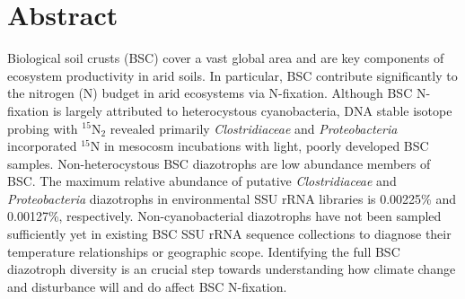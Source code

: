\section{Abstract}
Biological soil crusts (BSC) cover a vast global area and are key components of
ecosystem productivity in arid soils. In particular, BSC contribute
significantly to the nitrogen (N) budget in arid ecosystems via N-fixation.
Although BSC N-fixation is largely attributed to heterocystous cyanobacteria,
DNA stable isotope probing with $^{15}$N$_{2}$ revealed primarily
\textit{Clostridiaceae} and \textit{Proteobacteria} incorporated $^{15}$N in
mesocosm incubations with light, poorly developed BSC samples.
Non-heterocystous BSC diazotrophs are low abundance members of BSC. The maximum
relative abundance of putative \textit{Clostridiaceae} and
\textit{Proteobacteria} diazotrophs in environmental SSU rRNA libraries  is
0.00225\% and 0.00127\%, respectively.  
Non-cyanobacterial diazotrophs have not been sampled sufficiently yet in
existing BSC SSU rRNA sequence collections to diagnose their temperature
relationships or geographic scope. Identifying the full BSC diazotroph
diversity is an crucial step towards understanding how climate change and
disturbance will and do affect BSC N-fixation.
